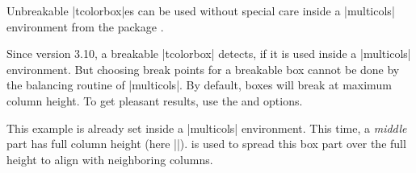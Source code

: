 \begin{multicols}{2}
\begin{tcolorbox}[enhanced jigsaw,size=small,breakable,colback=yellow!10!white,
  colframe=red!50!white,break at=3cm,height fixed for=all]
Unbreakable |tcolorbox|es can be used without special care inside a
|multicols| environment from the  package \cite{mittelbach:multicol}.

Since version 3.10, a breakable |tcolorbox| detects, if it is used inside
a |multicols| environment. But choosing break points for a breakable box
cannot be done by the balancing routine of |multicols|. By default, boxes
will break at maximum column height. To get pleasant results, use the
 and  options.
\end{tcolorbox}
\end{multicols}

\enlargethispage{\baselineskip}
\begin{dispListing}
\footnotesize
\begin{multicols}{2}
  \lipsum[1]
  \begin{tcolorbox}[enhanced jigsaw,breakable,size=title,
    colback=red!5!white,colframe=red!75!black,fonttitle=\bfseries,
    title=My breakable box,pad at break=1mm, break at=-\baselineskip/0pt ]
  \lipsum[2-4]
  \end{tcolorbox}
  \lipsum[4]
\end{multicols}
\end{dispListing}
{\tcbusetemp}

\clearpage

\begin{multicols}{2}
\small
This example is already set inside a |multicols| environment.
This time, a \emph{middle} part has full column height (here |\textheight|).
 is used to spread this box part over the full
height to align with neighboring columns.
\begin{dispListing}
\lipsum[1]
\begin{tcolorbox}[enhanced jigsaw,
  breakable,
  size=title,
  colback=red!5!white,
  colframe=red!75!black,
  fonttitle=\bfseries,
  title=My breakable box,
  pad at break=2mm,
  break at=-\baselineskip/0pt,
  height fixed for=middle ]
\lipsum[2-7]
\end{tcolorbox}
\lipsum[8]
\end{dispListing}
{\tcbusetemp}
\end{multicols}


